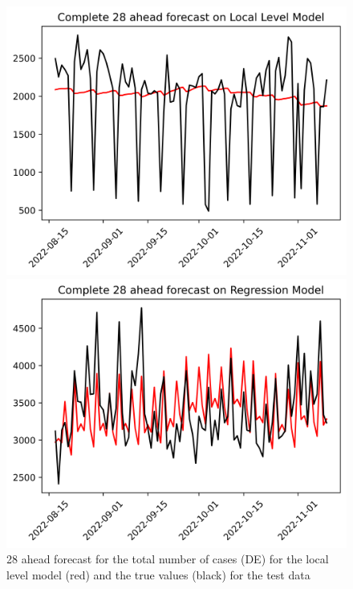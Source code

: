 \begin{figure}

\begin{minipage}{.32\textwidth}
  \centering
  \includegraphics[width=\linewidth]{pics/28_ah/DE_Complete_28_ahead_Local Level Model.png}
  \caption{28 ahead forecast for the total number of cases (DE) for the local level model (red) and the true values (black) for the test data}
  \label{fig:tot_cases_fc_28_LLM_DE}
\end{minipage}
\begin{minipage}{.32\textwidth}
  \centering
  \includegraphics[width=\linewidth]{pics/28_ah/Complete_28_ahead_Regression Model.png}

\end{minipage}
\end{figure}
